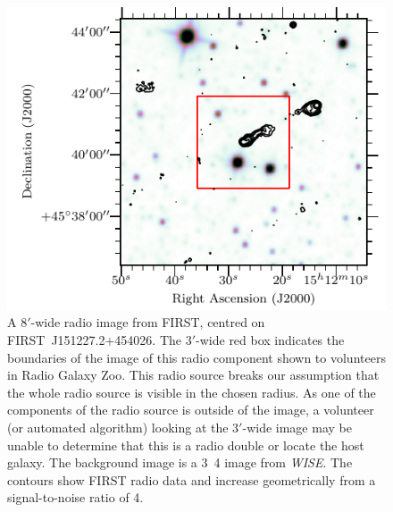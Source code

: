 \documentclass[fleqn,usenatbib,usedcolumn]{mnras}
\newcommand{\edited}[1]{#1}
\begin{document}
    \begin{figure}
      \centering
      \includegraphics[width=\linewidth]{images/FIRSTJ151227_fig.pdf}
      \caption{A $8'$-wide radio image from FIRST, centred on
        FIRST\ J151227.2+454026. The $3'$-wide red box indicates the boundaries of
        the image of this radio component shown to volunteers in Radio Galaxy
        Zoo. This radio source breaks our assumption that the whole radio source
        is visible in the chosen radius. As one of the \edited{components} of the radio source
        is outside of the image, a volunteer (or automated algorithm) looking at
        the $3'$-wide image may be unable to determine that this is a radio
        double or locate the host galaxy. \edited{The background image
        is a \unit{3.4}{\micro\meter} image from \emph{WISE}. The contours show FIRST radio
        data and increase geometrically from a signal-to-noise ratio of 4.}}
      \label{fig:broken-contains}
    \end{figure}
\end{document}
